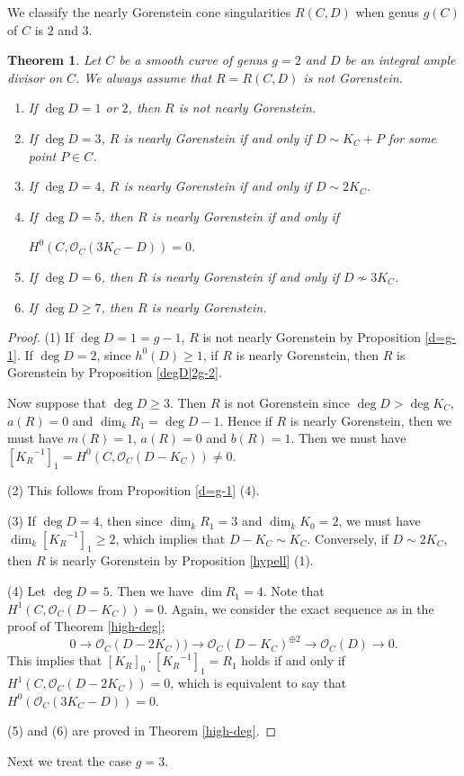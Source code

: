 \documentclass[12pt]{amsart}
\newtheorem{thm}{Theorem}[section]
\theoremstyle{definition}
\theoremstyle{remark}
\numberwithin{equation}{section}
\newcommand{\KiR}{{K_R}^{-1}}
\newcommand{\cO}{\mathcal O}
\renewcommand{\:}{\colon}
\begin{document}
\par
We classify the nearly Gorenstein cone singularities $R(C,D)$ when genus $g(C)$ of $C$ is $2$ and $3$. 

\begin{thm}\label{g=2} 
Let $C$ be a smooth curve of genus $g=2$ and $D$ be an integral  ample divisor on $C$.
We always assume that $R=R(C,D)$ is not Gorenstein. 
\begin{enumerate}
\item If $\deg D=1$ or $2$, then $R$ is not nearly Gorenstein. 
\item If $\deg D =3$, $R$ is  nearly Gorenstein
 if and only if $D \sim K_C + P$ for some point $P\in C$.
\item If $\deg D=4$, $R$ is nearly Gorenstein if and only 
if $D \sim 2K_C$. 
\item If $\deg D = 5$, then $R$ is  nearly Gorenstein if and only if 
\par\noindent
$H^0(C, \cO_C(3K_C -D))=0$. 
\item If $\deg D = 6$, then $R$ is nearly Gorenstein 
if and only if $D \not \sim 3K_C$. 
\item If $\deg D \ge 7$, then $R$ is nearly Gorenstein. 
\end{enumerate}
\end{thm}

\begin{proof} (1)
If $\deg D = 1 =g-1$, $R$ is
  not nearly Gorenstein by Proposition \ref{d=g-1}. If $\deg D =2$, since $h^0(D)\ge 1$, 
 if $R$ is nearly Gorenstein, then $R$ is Gorenstein by Proposition \ref{degD|2g-2}. 
\par 
Now suppose that $\deg D \ge 3$. 
Then $R$ is not Gorenstein since $\deg D > \deg K_C$, 
$a(R)=0$ and $\dim_k R_1 = \deg D -1$. Hence if
$R$ is nearly Gorenstein, then we must have $m(R)=1$, $a(R)=0$ and $b(R)=1$. 
Then we must have $[\KiR]_1= H^0(C, \cO_C(D-K_C))\ne 0$. 
\par
(2) This follows from Proposition \ref{d=g-1} (4). 
\par
(3) If $\deg D =4$, then since $\dim_k R_1=3$ and 
$\dim_k K_0 =2$, we must have 
$\dim_k [\KiR]_1 \ge 2$, which implies that $D -K_C \sim K_C$. Conversely, if $D\sim 2K_C$, then 
$R$ is nearly Gorenstein by Proposition \ref{hypell} (1).


\par 
\vspace{1mm}
(4)  Let $\deg D =5$. Then we have $\dim R_1 =4$. 
 Note that $H^1(C,\cO_C(D-K_C))=0$.
 Again, we consider the exact sequence as in the proof of Theorem 
\ref{high-deg};  
\[ 0 \to \cO_C(D-2K_C)) \to \cO_C( D- K_C)^{\oplus 2} \to \cO_C(D ) \to 0.\]  
This implies that $[K_R]_0\cdot [\KiR]_1 =R_1$ holds if and only if $H^1(C, \cO_C(D - 2K_C))=0$, 
which is equivalent to say that $H^0( \cO_C(3K_C -D))= 0$.

\par \vspace{1mm}
(5) and (6) are proved in Theorem \ref{high-deg}.
\end{proof}
Next we treat the case $g=3$.
\end{document}
